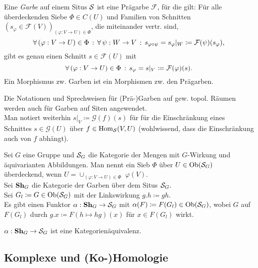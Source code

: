 \documentclass{cheat-sheet}
\newcommand{\Fais}{\mathcal{F}} %
\newcommand{\Garb}{\mathcal{G}} %
\begin{document}
\begin{defn}
  Eine \emph{Garbe} auf einem Situs $\mathcal{S}$ ist eine Prägarbe $\Fais$, für die gilt:
  Für alle überdeckenden Siebe $\Phi \in C(U)$ und Familien von Schnitten $(s_\varphi \in \Fais(V))_{(\varphi : V \to U) \in \Phi}$, die miteinander vertr. sind, \dh{}
  \[ \fa{(\varphi : V \to U) \in \Phi} \fa{\psi : W \to V} s_{\varphi \circ \psi} = s_\varphi|_W \coloneqq \Fais(\psi)(s_\varphi), \]
  gibt es genau einen Schnitt $s \in \Fais(U)$ mit
  \[ \fa{(\varphi : V \to U) \in \Phi} s_\varphi = s|_V \coloneqq \Fais(\varphi)(s). \]
  Ein Morphismus zw. Garben ist ein Morphismen zw. den Prägarben.
\end{defn}

\begin{bem}
  Die Notationen und Sprechweisen für (Prä-)Garben auf gew. topol. Räumen werden auch für Garben auf Siten angewendet. \\
  Man notiert weiterhin $s|_V \coloneqq \Garb(f)(s)$ für für die Einschränkung eines Schnittes $s \in \Garb(U)$ über $f \in \operatorname{Hom}_{\mathcal{S}}(V, U)$ (wohlwissend, dass die Einschränkung auch von $f$ abhängt).
\end{bem}

\begin{bsp}
  Sei $G$ eine Gruppe und $\mathcal{S}_G$ die Kategorie der Mengen mit $G$-Wirkung und äquivarianten Abbildungen. Man nennt ein Sieb $\Phi$ über $U \in \operatorname{Ob}(\mathcal{S}_G)$ überdeckend, wenn
  $U = \cup_{(\varphi : V \to U) \in \Phi} \,\, \varphi(V)$. \\
  Sei $\mathbf{Sh}_G$ die Kategorie der Garben über dem Situs $\mathcal{S}_G$. \\
  Sei $G_l \coloneqq G \in \operatorname{Ob}(\mathcal{S}_G)$ mit der Linkswirkung $g.h \coloneqq gh$. \\
  Es gibt einen Funktor $\alpha : \mathbf{Sh}_G \to \mathcal{S}_G$ mit $\alpha(F) \coloneqq F(G_l) \in \operatorname{Ob}(\mathcal{S}_G)$, wobei $G$ auf $F(G_l)$ durch $g.x \coloneqq F(h \mapsto hg)(x)$ für $x \in F(G_l)$ wirkt.
\end{bsp}

\begin{prop}
  $\alpha : \mathbf{Sh}_G \to \mathcal{S}_G$ ist eine Kategorienäquivalenz.
\end{prop}



\begin{samepage}

\section{Komplexe und (Ko-)Homologie}

\end{samepage}
\end{document}
